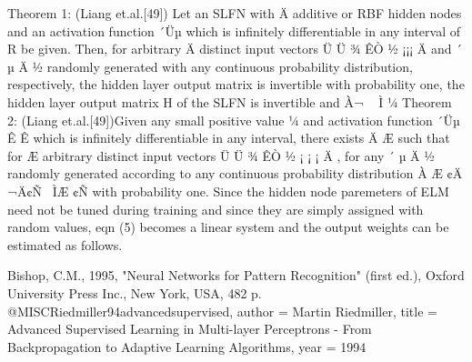 \documentclass[
	article,			%
	11pt,				%
	oneside,			%
	a4paper,			%
	english,			%
	brazil,				%
	sumario=tradicional
	]{abntex2}
\begin{document}
   Theorem 1: (Liang et.al.[49]) Let an SLFN with Ä additive or RBF hidden
nodes and an activation function ´Üµ which is infinitely differentiable in any
interval of R be given. Then, for arbitrary Ä distinct input vectors Ü Ü ¾
ÊÒ        ½ ¡¡¡ Ä      and ´       µ Ä ½ randomly generated with any continuous
probability distribution, respectively, the hidden layer output matrix is invertible
with probability one, the hidden layer output matrix H of the SLFN is invertible
and À¬   Ì          ¼
   Theorem 2: (Liang et.al.[49])Given any small positive value               ¼ and
activation function ´Üµ        Ê      Ê which is infinitely differentiable in any
interval, there exists Ä      Æ such that for Æ arbitrary distinct input vectors
 Ü Ü ¾ ÊÒ         ½ ¡ ¡ ¡ Ä , for any ´      µ Ä ½ randomly generated according to
any continuous probability distribution À Æ ¢Ä ¬Ä¢Ñ  ÌÆ ¢Ñ         with probability
one.
   Since the hidden node paremeters of ELM need not be tuned during training
and since they are simply assigned with random values, eqn (5) becomes a linear
system and the output weights can be estimated as follows.

% 


\begin{citacao}

\end{citacao}




Bishop, C.M., 1995, "Neural Networks for Pattern Recognition" (first ed.),
Oxford University Press Inc., New York, USA, 482 p.
 @MISC{Riedmiller94advancedsupervised,
    author = {Martin Riedmiller},
    title = {Advanced Supervised Learning in Multi-layer Perceptrons - From Backpropagation to Adaptive Learning Algorithms},
    year = {1994}
}

 
%
%
\end{document}
